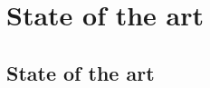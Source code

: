 \documentclass{beamer}
\begin{document}
		
%
%
%

\section{State of the art}

\subsection*{State of the art}
\end{document}
